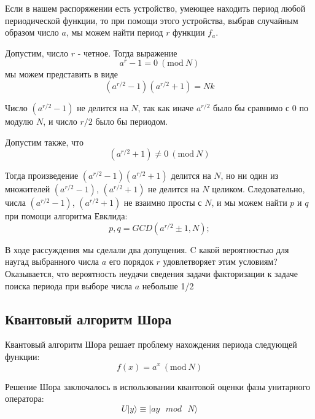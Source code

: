 \documentclass[14pt]{article}
\newcommand{\Mod}[1]{\ (\mathrm{mod}\ #1)}
\begin{document}
	Если в нашем распоряжении есть устройство, умеющее находить период любой периодической функции, то при помощи этого устройства, выбрав случайным образом число $a$, мы можем найти период $r$ функции $f_a$.
	
	Допустим, число $r$ - четное. Тогда выражение
	\begin{equation}
		a^r - 1 = 0 \Mod{N}
	\end{equation}
	мы можем представить в виде 
	\begin{equation}
		(a^{r/2} - 1)(a^{r/2} + 1) = Nk
	\end{equation}
	
	Число $(a^{r/2} - 1)$ не делится на $N$, так как иначе $a^{r/2}$ было
бы сравнимо с $0$ по модулю $N$, и число $r/2$ было бы периодом.	
	
	Допустим также, что
	\begin{equation}
		(a^{r/2} + 1) \neq 0 \Mod{N}
	\end{equation}
	
	Тогда произведение $(a^{r/2} - 1)(a^{r/2} + 1)$ делится на $N$, но 
ни один из множителей $(a^{r/2} - 1)$, $(a^{r/2} + 1)$ не делится на $N$
целиком. Следовательно, числа $(a^{r/2} - 1)$, $(a^{r/2} + 1)$ не взаимно
просты с $N$, и мы можем найти $p$ и $q$ при помощи алгоритма Евклида:
	\begin{equation}
		p, q = GCD(a^{r/2} \pm 1, N);
	\end{equation}

	В ходе рассуждения мы сделали два допущения. C какой вероятностью для наугад выбранного числа $a$ его порядок $r$ удовлетворяет этим условиям? Оказывается, что вероятность неудачи сведения задачи факторизации к задаче поиска периода при выборе числа $a$ небольше 1/2
	
	\newpage
	\subsection{Квантовый алгоритм Шора}
	
	Квантовый алгоритм Шора решает проблему нахождения периода следующей функции:
	\begin{equation}
		f(x) = a^x \Mod{N}
	\end{equation}
	
	Решение Шора заключалось в использовании квантовой оценки фазы унитарного оператора:
	\begin{equation}
		U|y \rangle \equiv |ay \text{ } mod \text{ } N \rangle
	\end{equation}
	
\end{document}
